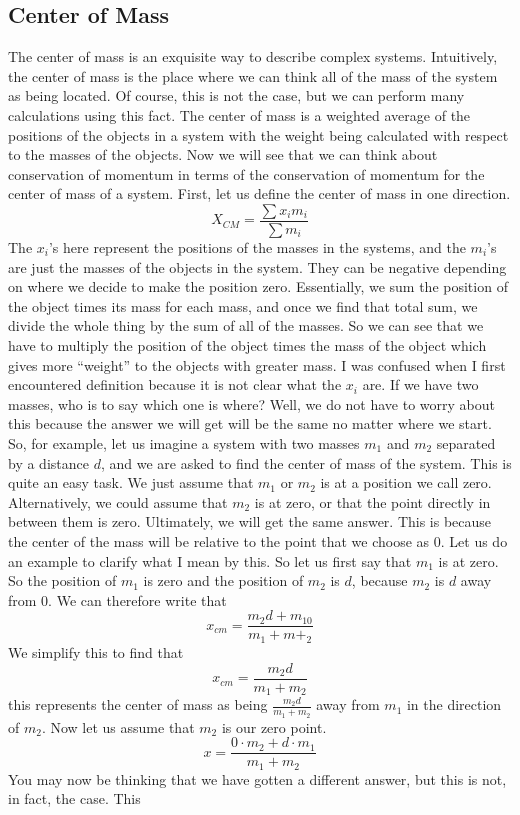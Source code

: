 \documentclass{article}[gray]
\numberwithin{equation}{subsection}
\begin{document}
\subsection{Center of Mass}
\newline
The center of mass is an exquisite way to describe complex systems. Intuitively, the center of mass is the place where we can think all of the mass of the system as being located. Of course, this is not the case, but we can perform many calculations using this fact. The center of mass is a weighted average of the positions of the objects in a system with the weight being calculated with respect to the masses of the objects. Now we will see that we can think about conservation of momentum in terms of the conservation of momentum for the center of mass of a system. First, let us define the center of mass in one direction. \begin{equation}X_{CM}= \frac{\sum x_i m_i}{\sum m_i}\end{equation} The $x_i$’s here represent the positions of the masses in the systems, and the $m_i$’s are just the masses of the objects in the system. They can be negative depending on where we decide to make the position zero. Essentially, we sum the position of the object times its mass for each mass, and once we find that total sum, we divide the whole thing by the sum of all of the masses. So we can see that we have to multiply the position of the object times the mass of the object which gives more “weight” to the objects with greater mass. I was confused when I first encountered definition because it is not clear what the $x_i$ are. If we have two masses, who is to say which one is where? Well, we do not have to worry about this because the answer we will get will be the same no matter where we start. So, for example, let us imagine a system with two masses $m_1$ and $m_2$ separated by a distance $d$, and we are asked to find the center of mass of the system. This is quite an easy task. We just assume that $m_1$ or $m_2$ is at a position we call zero. Alternatively, we could assume that $m_2$ is at zero, or that the point directly in between them is zero. Ultimately, we will get the same answer. This is because the center of the mass will be relative to the point that we choose as 0. Let us do an example to clarify what I mean by this. So let us first say that $m_1$ is at zero. So the position of $m_1$ is zero and the position of $m_2$ is $d$, because $m_2$ is $d$ away from 0. We can therefore write that $$x_{cm} = \frac{m_2d+ m_10}{m_1+m+_2}$$ We simplify this to find that $$x_{cm} =\frac{m_2 d}{m_1+m_2}$$ this represents the center of mass as being $\frac{m_2 d}{m_1+m_2}$ away from $m_1$ in the direction of $m_2$. Now let us assume that $m_2$ is our zero point. $$x=\frac{0\cdot m_2+d\cdot m_1}{m_1+m_2}$$ You may now be thinking that we have gotten a different answer, but this is not, in fact, the case. This 
\end{document}
